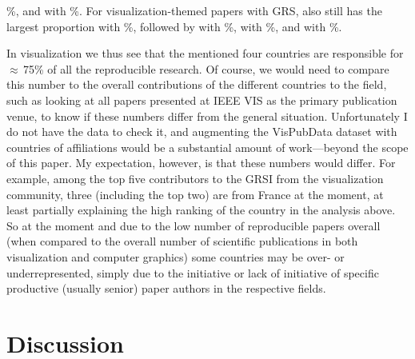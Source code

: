 \documentclass[conference,svgnames]{vgtc}                     %
\begin{document}
\GrsiCountryPieChartOverallSeniorNoThreePercentage{}\%, and \GrsiCountryPieChartOverallSeniorNoFourName{} with \GrsiCountryPieChartOverallSeniorNoFourPercentage{}\%. For visualization-themed papers with GRS, \GrsiCountryPieChartVisSeniorNoOneName{} also still has the largest proportion with \GrsiCountryPieChartVisSeniorNoOnePercentage{}\%, followed by \GrsiCountryPieChartVisSeniorNoTwoName{} with \GrsiCountryPieChartVisSeniorNoTwoPercentage{}\%, \GrsiCountryPieChartVisSeniorNoThreeName{} with \GrsiCountryPieChartVisSeniorNoThreePercentage{}\%, and \GrsiCountryPieChartVisSeniorNoFourName{} with \GrsiCountryPieChartVisSeniorNoFourPercentage{}\%.

In visualization we thus see that the mentioned four countries are responsible for $\approx$\,75\% of all the reproducible research. Of course, we would need to compare this number to the overall contributions of the different countries to the field, such as looking at all papers presented at IEEE VIS as the primary publication venue, to know if these numbers differ from the general situation. Unfortunately I do not have the data to check it, and augmenting the VisPubData dataset \cite{Isenberg:2017:VMC} with countries of affiliations would be a substantial amount of work---be\-yond the scope of this paper. My expectation, however, is that these numbers would differ. For example, among the top five contributors to the GRSI from the visualization community, three (including the top two) are from France at the moment, at least partially explaining the high ranking of the country in the analysis above. So at the moment and due to the low number of reproducible papers overall (when compared to the overall number of scientific publications in both visualization and computer graphics) some countries may be over- or underrepresented, simply due to the initiative or lack of initiative of specific productive (usually senior) paper authors in the respective fields.

\section{Discussion}
\label{sec:discussion}
\end{document}
